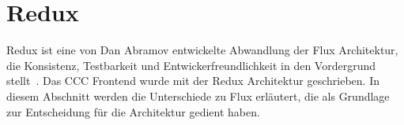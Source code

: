 \section{Redux}
\label{sec:g_redux}

Redux ist eine von Dan Abramov entwickelte Abwandlung der Flux Architektur, die
Konsistenz, Testbarkeit und Entwickerfreundlichkeit in den Vordergrund
stellt~\cite{redux}.  Das CCC Frontend wurde mit der Redux Architektur
geschrieben.  In diesem Abschnitt werden die Unterschiede zu Flux erläutert, die
als Grundlage zur Entscheidung für die Architektur gedient haben.



